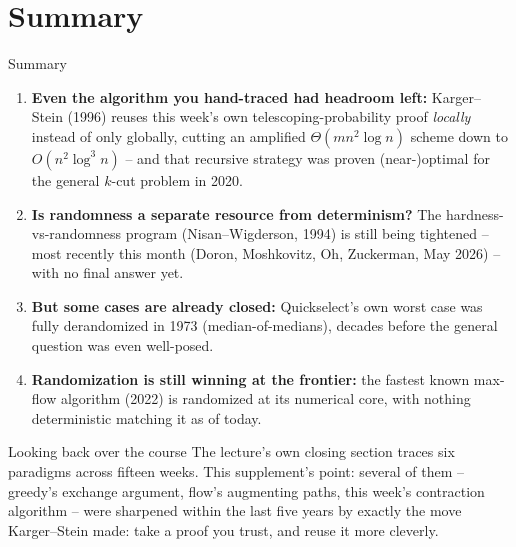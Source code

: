 \documentclass[11pt,aspectratio=169]{beamer}
\begin{document}
\section{Summary}

\begin{frame}{Summary}
  \footnotesize
  \begin{enumerate}
    \item \textbf{Even the algorithm you hand-traced had headroom left:}
    Karger--Stein (1996) reuses this week's own telescoping-probability proof
    \emph{locally} instead of only globally, cutting an amplified $\Theta(mn^2\log n)$
    scheme down to $O(n^2\log^3 n)$ -- and that recursive strategy was proven
    (near-)optimal for the general $k$-cut problem in 2020.
    \item \textbf{Is randomness a separate resource from determinism?} The
    hardness-vs-randomness program (Nisan--Wigderson, 1994) is still being tightened --
    most recently this month (Doron, Moshkovitz, Oh, Zuckerman, May 2026) -- with no
    final answer yet.
    \item \textbf{But some cases are already closed:} Quickselect's own worst case was
    fully derandomized in 1973 (median-of-medians), decades before the general question
    was even well-posed.
    \item \textbf{Randomization is still winning at the frontier:} the fastest known
    max-flow algorithm (2022) is randomized at its numerical core, with nothing
    deterministic matching it as of today.
  \end{enumerate}
  \begin{alertblock}{Looking back over the course}
    The lecture's own closing section traces six paradigms across fifteen weeks. This
    supplement's point: several of them -- greedy's exchange argument, flow's
    augmenting paths, this week's contraction algorithm -- were sharpened within the
    last five years by exactly the move Karger--Stein made: take a proof you trust, and
    reuse it more cleverly.
  \end{alertblock}
\end{frame}
\end{document}
